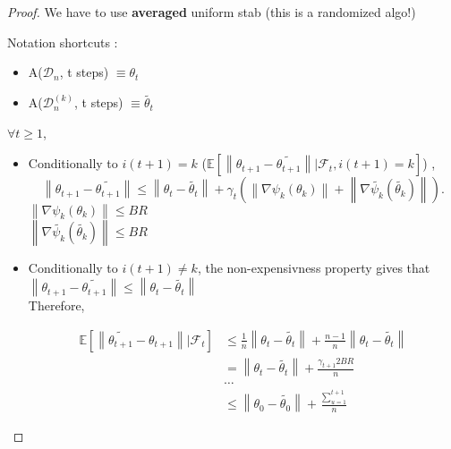 \begin{proof}
    We have to use \textbf{averaged} uniform stab (this is a randomized algo!)

    Notation shortcuts : \begin{itemize}
        \item A($\mathcal{D}_n$, t steps) $\equiv \theta_t$
        \item A($\mathcal{D}_n^{(k)}$, t steps) $\equiv \tilde{\theta_t}$
    \end{itemize}

    $\forall t \geq 1$,

    \begin{itemize}
        \item Conditionally to $i(t+1) = k$ ($\mathbb{E}[ \left\| \theta_{t+1} - \tilde{\theta_{t+1}} \right\| | \mathcal{F}_t, i(t+1)= k]$) , 
        \[
            \left\| \theta_{t+1} - \tilde{\theta_{t+1}} \right\| \leq \left\| \theta_{t} - \tilde{\theta_{t}} \right\| + \gamma _t ( \left\| \nabla \psi_k (\theta _k) \right\| + \left\| \nabla \tilde{\psi_k} (\tilde{\theta _k}) \right\|)
        .\]
        $\left\| \nabla \psi_k (\theta _k) \right\| \leq BR$ \\
        $\left\| \nabla \tilde{\psi_k} (\tilde{\theta _k}) \right\| \leq BR$

        \item Conditionally to $i(t+1) \neq  k$, the non-expensivness property gives that $\left\|  \theta_{t+1} - \tilde{\theta_{t+1}} \right\| \leq \left\|  \theta_{t} - \tilde{\theta_{t}} \right\|$ \\
        Therefore,
        
        \begin{align*}
            \mathbb{E}[ \left\| \tilde{\theta_{t+1}} - \theta_{t+1} \right\| | \mathcal{F}_t] &\leq \frac{1}{n} \left\| \theta_{t} - \tilde{\theta_{t}} \right\| + \frac{n-1}{n} \left\| \theta_{t} - \tilde{\theta_{t}} \right\| \\
            & = \left\| \theta_{t} - \tilde{\theta_{t}} \right\| + \frac{\gamma _ {t+1} 2BR}{n} \\
            & \dots \\
            & \leq \left\| \theta_0 - \tilde{\theta _0} \right\|  + \frac{\sum_{u=1}^{t+1}}{n}
        \end{align*}
            

\end{itemize}
\end{proof}
